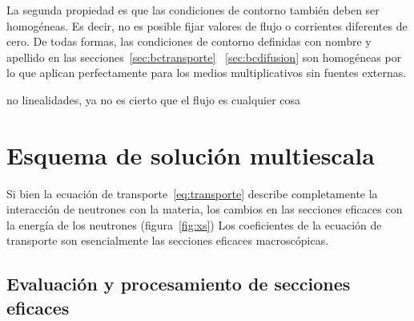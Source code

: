 La segunda propiedad es que las condiciones de contorno también deben ser homogéneas. Es decir, no es posible fijar valores de flujo o corrientes diferentes de cero. De todas formas, las condiciones de contorno definidas con nombre y apellido en las secciones~\ref{sec:bctransporte} ~\ref{sec:bcdifusion} son homogéneas por lo que aplican perfectamente para los medios multiplicativos sin fuentes externas.

{\color{red} no linealidades, ya no es cierto que el flujo es cualquier cosa}



\section{Esquema de solución multiescala} %
\label{sec:multiescala}

Si bien la ecuación de transporte~\eqref{eq:transporte} describe completamente la interacción de neutrones con la materia, los cambios en las secciones eficaces con la energía de los neutrones (figura~\ref{fig:xs})  
Los coeficientes de la ecuación de transporte son esencialmente las secciones eficaces macroscópicas.

\subsection{Evaluación y procesamiento de secciones eficaces} %
\label{sec:evaluacionxs}


